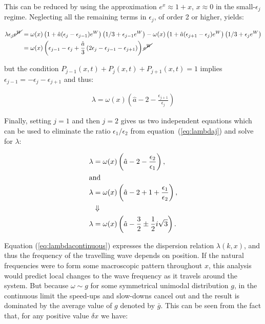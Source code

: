 \noindent This can be reduced by using the approximation $e^x \approx 1 + x$, $x\approx 0$ in the small-$\epsilon_j$ regime. Neglecting
all the remaining terms in $\epsilon_j$, of order 2 or higher, yields:

\begin{align}
  \lambda \epsilon_j\cancel{e^W} &= \omega(x)\left(1+\hat{a}(\epsilon_j-\epsilon_{j-1})e^W\right)\left(1/3+\epsilon_{j-1}e^W\right)
  - \omega(x)\left(1+\hat{a}(\epsilon_{j+1}-\epsilon_j)e^W\right)\left(1/3+\epsilon_je^W\right) \notag \\
  &= \omega(x)\left( \epsilon_{j-1} - \epsilon_j + \frac{\hat{a}}{3}\left( 2\epsilon_j - \epsilon_{j-1} - \epsilon_{j+1} \right) \right)\cancel{e^W} \notag
\end{align}

\noindent but the condition $P_{j-1}(x,t)+P_j(x,t)+P_{j+1}(x,t)=1$ implies $\epsilon_{j-1}=-\epsilon_j-\epsilon_{j+1}$ and thus:

\begin{align}
  \lambda = \omega(x)\left( \hat{a}-2 - \frac{\epsilon_{j+1}}{\epsilon_j} \right)
  \label{eq:lambdaj}
\end{align}

Finally, setting $j=1$ and then $j=2$ gives us two independent equations which can be used to eliminate the ratio
$\epsilon_1/\epsilon_2$ from equation~(\ref{eq:lambdaj}) and solve for $\lambda$:

\begin{align}
  \lambda &= \omega(x)\left( \hat{a} - 2 - \frac{\epsilon_2}{\epsilon_1} \right), \notag \\
	\intertext{and}
  \lambda &= \omega(x)\left( \hat{a} - 2 + 1 + \frac{\epsilon_1}{\epsilon_2} \right), \notag \\
  &\Downarrow \notag \\
  \lambda &= \omega(x)\left( \hat{a} - \frac{3}{2} \pm \frac{1}{2}i\sqrt{3} \right).
  \label{eq:lambdacontinuous}
\end{align}

Equation (\ref{eq:lambdacontinuous}) expresses the dispersion relation $\lambda(k,x)$, and thus the frequency of the travelling wave
depends on position. If the natural frequencies were to form some macroscopic pattern throughout $x$, this analysis would predict local
changes to the wave frequency as it travels around the system. But because $\omega \sim g$ for some symmetrical unimodal distribution
$g$, in the continuous limit the speed-ups and slow-downs cancel out and the result is dominated by the average value of $g$ denoted by
$\bar{g}$. This can be seen from the fact that, for any positive value $\delta x$ we have:

